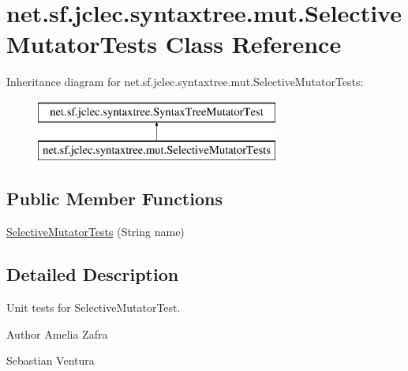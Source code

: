 \hypertarget{classnet_1_1sf_1_1jclec_1_1syntaxtree_1_1mut_1_1_selective_mutator_tests}{\section{net.\-sf.\-jclec.\-syntaxtree.\-mut.\-Selective\-Mutator\-Tests Class Reference}
\label{classnet_1_1sf_1_1jclec_1_1syntaxtree_1_1mut_1_1_selective_mutator_tests}
}
Inheritance diagram for net.\-sf.\-jclec.\-syntaxtree.\-mut.\-Selective\-Mutator\-Tests\-:\begin{figure}[H]
\begin{center}
\leavevmode
\includegraphics[height=2.000000cm]{classnet_1_1sf_1_1jclec_1_1syntaxtree_1_1mut_1_1_selective_mutator_tests}
\end{center}
\end{figure}
\subsection*{Public Member Functions}
\begin{DoxyCompactItemize}
\item 
\hyperlink{classnet_1_1sf_1_1jclec_1_1syntaxtree_1_1mut_1_1_selective_mutator_tests_aafefa982848abbc74c1a07e25a002efa}{Selective\-Mutator\-Tests} (String name)
\end{DoxyCompactItemize}


\subsection{Detailed Description}
Unit tests for Selective\-Mutator\-Test.

\begin{DoxyAuthor}{Author}
Amelia Zafra 

Sebastian Ventura 
\end{DoxyAuthor}


